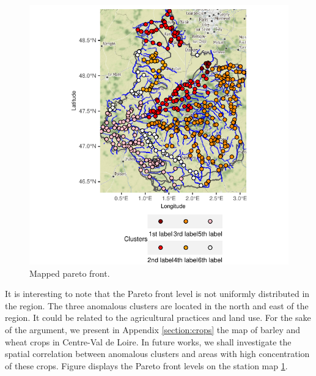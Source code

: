\begin{figure}[ht]
  \centering
  \includegraphics[]{figs/Chap5/Pareto_map.pdf}
  \caption{Mapped pareto front.}
  \label{fig:pareto:map}
\end{figure}

It is interesting to note that the Pareto front level is not uniformly distributed in the region. The three anomalous clusters are located in the north and east of the region. It could be related to the agricultural practices and land use. For the sake of the argument, we present in Appendix \ref{section:crops} the map of barley and wheat crops in Centre-Val de Loire. In future works, we shall investigate the spatial correlation between anomalous clusters and areas with high concentration of these crops. Figure  displays the Pareto front levels on the station map \ref{fig:pareto:map}.
